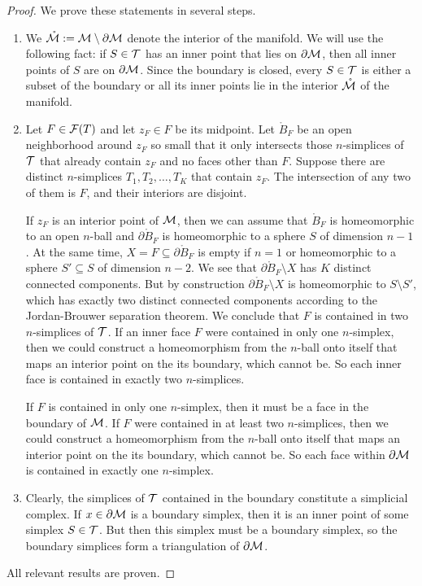 \documentclass[a4paper]{article}
\begin{document}
\begin{proof}
    We prove these statements in several steps.
    \begin{enumerate}
    \item 
    We $\mathring {{\mathcal M}} := {\mathcal M} \setminus \partial {\mathcal M}$ denote the interior of the manifold. 
    We will use the following fact: if $S \in {\mathcal T}$ has an inner point that lies on $\partial {\mathcal M}$, then all inner points of $S$ are on $\partial {\mathcal M}$. 
    Since the boundary is closed, every $S \in {\mathcal T}$ is either a subset of the boundary or all its inner points lie in the interior $\mathring {{\mathcal M}}$ of the manifold. 
    
    \item
    Let $F \in {\mathcal F}(T)$ and let $z_F \in F$ be its midpoint. 
    Let $\mathring B_F$ be an open neighborhood around $z_F$ so small that it only intersects those $n$-simplices of ${\mathcal T}$ that already contain $z_F$ and no faces other than $F$.
    Suppose there are distinct $n$-simplices $T_1, T_2, \dots, T_K$ that contain $z_F$. 
    The intersection of any two of them is $F$, and their interiors are disjoint. 
    
    If $z_F$ is an interior point of ${\mathcal M}$, 
    then we can assume that $\mathring B_F$ is homeomorphic to an open $n$-ball and $\partial \mathring B_F$ is homeomorphic to a sphere $S$ of dimension $n-1$. 
    At the same time, $X = F \subseteq \partial \mathring B_F$ is empty if $n=1$ or homeomorphic to a sphere $S' \subseteq S$ of dimension $n-2$. 
    We see that $\partial \mathring B_F \setminus X$ has $K$ distinct connected components. 
    But by construction $\partial \mathring B_F \setminus X$ is homeomorphic to $S \setminus S'$,
    which has exactly two distinct connected components according to the Jordan-Brouwer separation theorem.
    We conclude that $F$ is contained in two $n$-simplices of ${\mathcal T}$.
    If an inner face $F$ were contained in only one $n$-simplex,
    then we could construct a homeomorphism from the $n$-ball onto itself that maps an interior point on the its boundary, which cannot be.
    So each inner face is contained in exactly two $n$-simplices. 
    
    If $F$ is contained in only one $n$-simplex, then it must be a face in the boundary of ${\mathcal M}$. 
    If $F$ were contained in at least two $n$-simplices,
    then we could construct a homeomorphism from the $n$-ball onto itself that maps an interior point on the its boundary, which cannot be.
    So each face within $\partial {\mathcal M}$ is contained in exactly one $n$-simplex. 
    
    \item
    Clearly, the simplices of ${\mathcal T}$ contained in the boundary constitute a simplicial complex. 
    If $x \in \partial {\mathcal M}$ is a boundary simplex, then it is an inner point of some simplex $S \in {\mathcal T}$.
    But then this simplex must be a boundary simplex, so the boundary simplices form a triangulation of $\partial {\mathcal M}$.
    \end{enumerate}
    All relevant results are proven. 
\end{proof}
\end{document}
